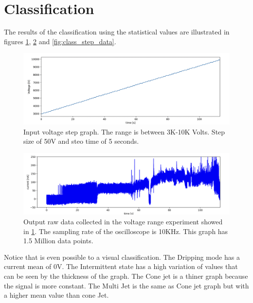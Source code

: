 \section{Classification}
\label{sec:classification_results}

The results of the classification using the statistical values are illustrated in figures \ref{fig:step_voltage}, \ref{fig:raw_data} and \ref{fig:class_step_data}.


\begin{figure}[H]
    \center
    \includegraphics[width=12cm]{Figuras/19:03/voltage_step.png}
    \caption{Input voltage step graph. The range is between 3K-10K Volts. Step size of 50V and steo time of 5 seconds.}
    \label{fig:step_voltage}
\end{figure}


\begin{figure}[H]
    \center
    \includegraphics[width=12cm]{Figuras/19:03/raw-data-example.png}
    \caption{Output raw data collected in the voltage range experiment showed in \ref{fig:step_voltage}. The sampling rate of the oscilloscope is 10KHz. This graph has 1.5 Million data points.}
    \label{fig:raw_data}
\end{figure}

Notice that is even possible to a visual classification. The Dripping mode has a current mean of 0V. The Intermittent state has a high variation of values that can be seen by the thickness of the graph. The Cone jet is a thiner graph because the signal is more constant. The Multi Jet is the same as Cone jet graph but with a higher mean value than cone Jet.


